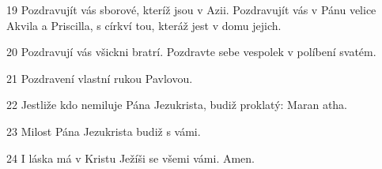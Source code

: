 \par 19 Pozdravujít vás sborové, kteríž jsou v Azii. Pozdravujít vás v Pánu velice Akvila a Priscilla, s církví tou, kteráž jest v domu jejich.
\par 20 Pozdravují vás všickni bratrí. Pozdravte sebe vespolek v políbení svatém.
\par 21 Pozdravení vlastní rukou Pavlovou.
\par 22 Jestliže kdo nemiluje Pána Jezukrista, budiž proklatý: Maran atha.
\par 23 Milost Pána Jezukrista budiž s vámi.
\par 24 I láska má v Kristu Ježíši se všemi vámi. Amen.


